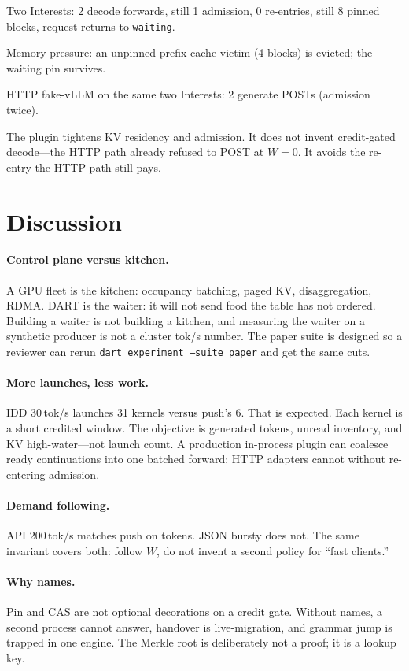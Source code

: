 \documentclass{article}
\theoremstyle{definition}
\begin{document}
Two Interests: 2 decode forwards, still 1 admission, 0 re-entries, still 8 pinned blocks, request returns to \texttt{waiting}.

Memory pressure: an unpinned prefix-cache victim (4 blocks) is evicted; the waiting pin survives.

HTTP fake-vLLM on the same two Interests: 2 generate POSTs (admission twice).

The plugin tightens KV residency and admission.
It does not invent credit-gated decode---the HTTP path already refused to POST at $W{=}0$.
It avoids the re-entry the HTTP path still pays.

\section{Discussion}
\label{sec:disc}

\paragraph{Control plane versus kitchen.}
A GPU fleet is the kitchen: occupancy batching, paged KV, disaggregation, RDMA.
DART is the waiter: it will not send food the table has not ordered.
Building a waiter is not building a kitchen, and measuring the waiter on a synthetic producer is not a cluster tok/s number.
The paper suite is designed so a reviewer can rerun \texttt{dart experiment --suite paper} and get the same cuts.

\paragraph{More launches, less work.}
IDD 30\,tok/s launches 31 kernels versus push's 6.
That is expected.
Each kernel is a short credited window.
The objective is generated tokens, unread inventory, and KV high-water---not launch count.
A production in-process plugin can coalesce ready continuations into one batched forward; HTTP adapters cannot without re-entering admission.

\paragraph{Demand following.}
API 200\,tok/s matches push on tokens.
JSON bursty does not.
The same invariant covers both: follow $W$, do not invent a second policy for ``fast clients.''

\paragraph{Why names.}
Pin and CAS are not optional decorations on a credit gate.
Without names, a second process cannot answer, handover is live-migration, and grammar jump is trapped in one engine.
The Merkle root is deliberately not a proof; it is a lookup key.
\end{document}
